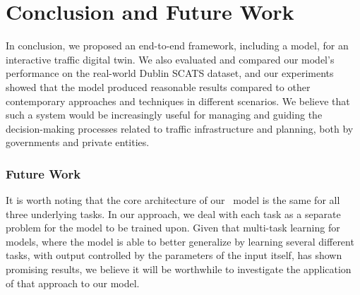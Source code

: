 \chapter{Conclusion and Future Work}\label{final}

In conclusion, we proposed an end-to-end framework, including a model, for an interactive traffic digital twin. We also evaluated and compared our model's performance on the real-world Dublin SCATS dataset, and our experiments showed that the model produced reasonable results compared to other contemporary approaches and techniques in different scenarios. We believe that such a system would be increasingly useful for managing and guiding the decision-making processes related to traffic infrastructure and planning, both by governments and private entities.

\subsection*{Future Work}
It is worth noting that the core architecture of our \modelname\ model is the same for all three underlying tasks. In our approach, we deal with each task as a separate problem for the model to be trained upon. Given that multi-task learning for models, where the model is able to better generalize by learning several different tasks, with output controlled by the parameters of the input itself, has shown promising results, we believe it will be worthwhile to investigate the application of that approach to our model.